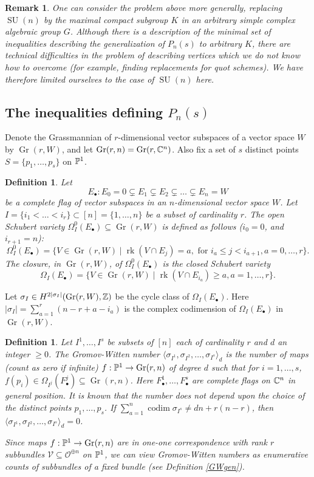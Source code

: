 \documentclass[11pt]{amsart}
\newcommand\bull{{\bullet}}
\newcommand\mv{\mathcal{V}}
\newcommand\codim{\operatorname{codim}}
\newcommand\rk{\operatorname{rk}}
\newcommand\Gr{\operatorname{Gr}}
\newtheorem{remark}[theorem]{ Remark}
\newtheorem{defi}[theorem]{Definition}
\numberwithin{theorem}{subsection}
\begin{document}
\begin{remark}
One can consider the problem above more generally, replacing  $\operatorname{SU}(n)$ by the maximal compact subgroup  $K$ in an arbitrary simple complex algebraic group $G$.
  Although there is a description of the minimal set of inequalities describing the generalization of $P_n(s)$ \cite{BKq} to arbitrary $K$, there are technical difficulties in the problem of describing vertices which we do not know how to overcome (for example, finding replacements for  quot schemes). We have therefore limited ourselves to the case of $\operatorname{SU}(n)$ here.
  \end{remark}
 \fi
\subsection{The inequalities defining $P_n(s)$}\label{ABWin}
Denote the Grassmannian of $r$-dimensional vector subspaces of a vector space $W$ by $\operatorname{Gr}(r,W)$, and  let
$\Gr(r,n)=\operatorname{Gr}(r,\Bbb{C}^n)$. Also fix a set of  $s$ distinct points $S=\{p_1,\dots,p_s\}$ on $\Bbb{P}^1$.
\begin{defi}\label{ineffable}
Let $$E_{\bull}:E_0=0\subsetneq E_1\subsetneq E_2\subsetneq\dots\subsetneq E_n=W$$  be a complete flag of vector subspaces in an $n$-dimensional vector space $W$. Let $I=\{i_1<\dots< i_r\}\subset [n]=\{1,\dots,n\}$ be a subset of cardinality $r$. The open Schubert variety $\Omega^0_I(E_{\bull})\subseteq \Gr(r,W)$ is defined as follows ($i_0=0$, and $i_{r+1}=n$):
$$\Omega^0_I(E_{\bull})=\{V\in \Gr(r,W)\mid \rk (V\cap E_j)=a,\text { for } i_a\leq j<i_{a+1}, a=0,\dots,r\}.$$
The closure, in $\Gr(r,W)$, of $\Omega^0_I(E_{\bull})$ is the closed Schubert variety
$$\Omega_I(E_{\bull})=\{V\in \Gr(r,W)\mid \rk (V\cap E_{i_a})\geq a, a=1,\dots,r\}.$$
\end{defi}
Let $\sigma_I\in H^{2|\sigma_I|}(\Gr(r,W),\Bbb{Z})$ be the cycle class of $\Omega_I(E_{\bull})$. Here
$|\sigma_I|=\sum_{a=1}^r(n-r+a-i_a)$
is the complex codimension of $\Omega_I(E_{\bull})$ in $\Gr(r,W)$.

\begin{defi}\label{GW}
Let $I^1,\dots ,I^s$ be subsets of $[n]$ each of cardinality $r$ and $d$ an integer $\geq 0$.
The Gromov-Witten number $\langle\sigma_{I^1}, \sigma_{I^2},\dots,\sigma_{I^s}\rangle_d$
is the number of maps (count as zero if infinite) $f:\Bbb{P}^1\to \operatorname{Gr}(r,n)$ of degree $d$ such that for $i=1,\dots,s$,
$f(p_i)\in\Omega_{I^j}(F^j_{\bullet})\subseteq \operatorname{Gr}(r,n)$. Here $F^1_{\bullet},\dots,F^s_{\bullet}$ are complete flags on $\Bbb{C}^n$ in general position. It is known that the number does not depend upon the choice of the distinct points $p_1,\dots,p_s$. If $\sum_{a=1}^n\codim \sigma_{I^s}\neq dn +r(n-r)$, then $\langle\sigma_{I^1}, \sigma_{I^2},\dots,\sigma_{I^s}\rangle_d=0$. 

Since maps $f:\Bbb{P}^1\to \operatorname{Gr}(r,n)$ are in one-one correspondence with rank $r$ subbundles $\mv\subseteq \mathcal{O}^{\oplus n}$ on $\Bbb{P}^1$, we can view Gromov-Witten numbers as  enumerative counts of subbundles of a fixed bundle (see Definition \ref{GWgen}).
\end{defi}
\end{document}
